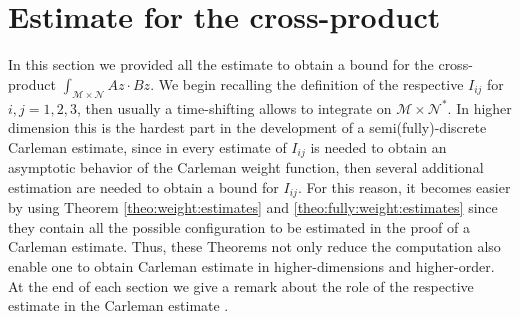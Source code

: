 \documentclass[11pt,oneside,leqno]{amsart}
\numberwithin{equation}{section}
\numberwithin{equation}{section}
\begin{document}
\section{Estimate for the cross-product}\label{sec:cross}
In this section we provided all the estimate to obtain a bound for the cross-product $\int_{\mathcal{M}\times\mathcal{N}}Az\cdot Bz$. We begin recalling the  definition of the respective $I_{ij}$ for $i,j=1,2,3$, then usually a time-shifting allows to integrate on $\mathcal{M}\times\mathcal{N}^{\ast}$. In higher dimension this is the hardest part in the development of a semi(fully)-discrete Carleman estimate, since in every estimate of $I_{ij}$ is needed to obtain an asymptotic behavior of the Carleman weight function, then several additional estimation are needed to obtain a bound for $I_{ij}$. For this reason, it becomes easier by using Theorem \ref{theo:weight:estimates} and \ref{theo:fully:weight:estimates} since they contain all the possible configuration to be estimated in the proof of a Carleman estimate. Thus, these Theorems not only reduce the computation also enable one to obtain Carleman estimate in higher-dimensions and higher-order. At the end of each section we give a remark about the role of the respective estimate in the Carleman estimate .
\end{document}
